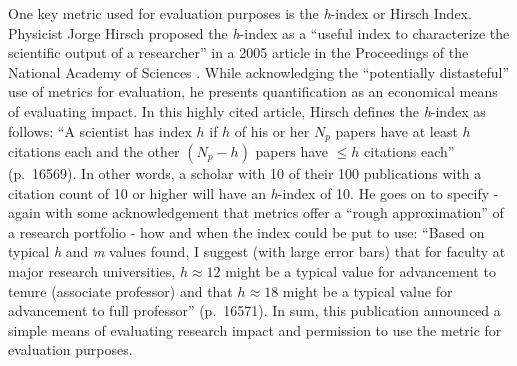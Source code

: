 \documentclass[
  10pt,
  letterpaper,
]{article}
\begin{document}
One key metric used for evaluation purposes is the \emph{h}-index or
Hirsch Index. Physicist Jorge Hirsch proposed the \emph{h}-index as a
``useful index to characterize the scientific output of a researcher''
in a 2005 article in the Proceedings of the National Academy of Sciences
\citep{hirsch_index_2005}. While acknowledging the ``potentially
distasteful'' use of metrics for evaluation, he presents quantification
as an economical means of evaluating impact. In this highly cited
article, Hirsch defines the \emph{h}-index as follows: ``A scientist has
index \(h\) if \(h\) of his or her \(N_p\) papers have at least \(h\)
citations each and the other \((N_p-h)\) papers have \(\le h\) citations
each'' (p.~16569). In other words, a scholar with 10 of their 100
publications with a citation count of 10 or higher will have an
\emph{h}-index of 10. He goes on to specify - again with some
acknowledgement that metrics offer a ``rough approximation'' of a
research portfolio - how and when the index could be put to use: ``Based
on typical \emph{h} and \emph{m} values found, I suggest (with large
error bars) that for faculty at major research universities,
\(h \approx 12\) might be a typical value for advancement to tenure
(associate professor) and that \(h \approx 18\) might be a typical value
for advancement to full professor'' (p.~16571). In sum, this publication
announced a simple means of evaluating research impact and permission to
use the metric for evaluation purposes.
\end{document}
